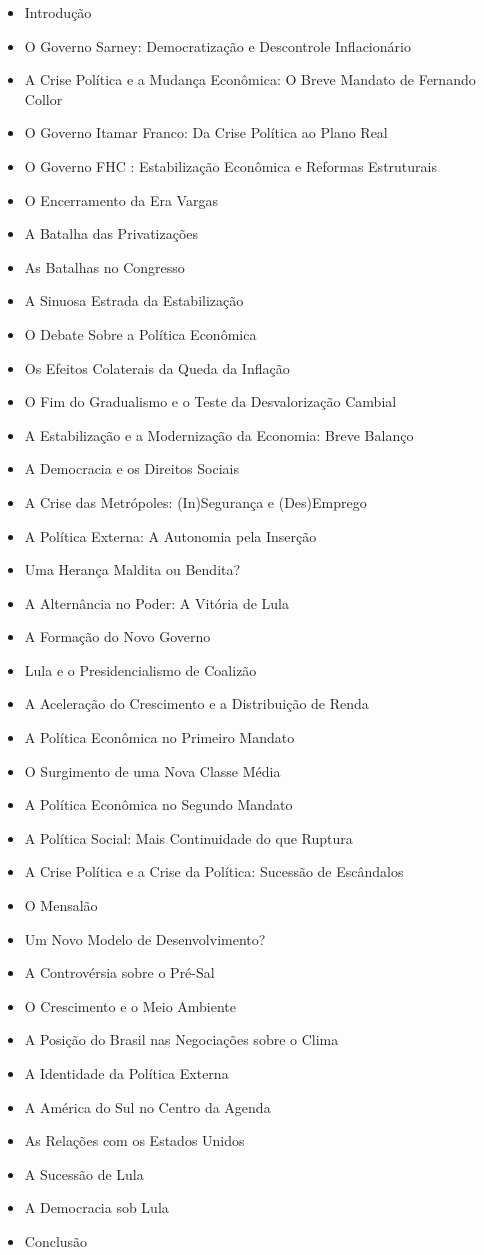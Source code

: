 \documentclass[a4paper,12pt]{article}[abntex2]
\begin{document}
\begin{itemize}
\item Introdução
\item O Governo Sarney: Democratização e Descontrole Inflacionário
\item A Crise Política e a Mudança Econômica: O Breve Mandato de Fernando Collor
\item O Governo Itamar Franco: Da Crise Política ao Plano Real
\item O Governo FHC : Estabilização Econômica e Reformas Estruturais
\item O Encerramento da Era Vargas
\item A Batalha das Privatizações
\item As Batalhas no Congresso
\item A Sinuosa Estrada da Estabilização
\item O Debate Sobre a Política Econômica
\item Os Efeitos Colaterais da Queda da Inflação
\item O Fim do Gradualismo e o Teste da Desvalorização Cambial
\item A Estabilização e a Modernização da Economia: Breve Balanço
\item A Democracia e os Direitos Sociais
\item A Crise das Metrópoles: (In)Segurança e (Des)Emprego
\item A Política Externa: A Autonomia pela Inserção
\item Uma Herança Maldita ou Bendita?
\item A Alternância no Poder: A Vitória de Lula
\item A Formação do Novo Governo
\item Lula e o Presidencialismo de Coalizão
\item A Aceleração do Crescimento e a Distribuição de Renda
\item A Política Econômica no Primeiro Mandato
\item O Surgimento de uma Nova Classe Média
\item A Política Econômica no Segundo Mandato
\item A Política Social: Mais Continuidade do que Ruptura
\item A Crise Política e a Crise da Política: Sucessão de Escândalos
\item O Mensalão
\item Um Novo Modelo de Desenvolvimento?
\item A Controvérsia sobre o Pré-Sal
\item O Crescimento e o Meio Ambiente
\item A Posição do Brasil nas Negociações sobre o Clima
\item A Identidade da Política Externa
\item A América do Sul no Centro da Agenda
\item As Relações com os Estados Unidos
\item A Sucessão de Lula
\item A Democracia sob Lula
\item Conclusão
\end{itemize}
\end{document}
